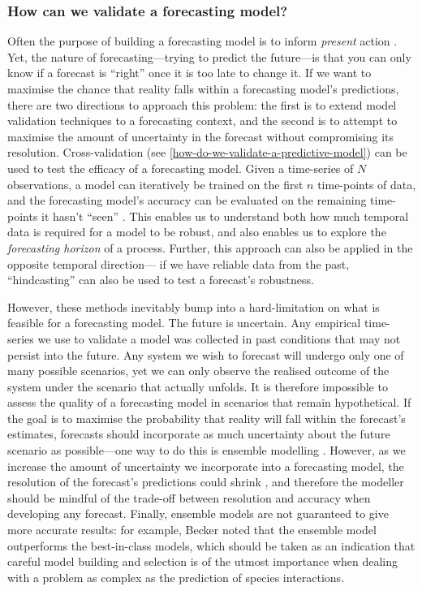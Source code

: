 \subsubsection{How can we validate a forecasting
model?}\label{how-can-we-validate-a-forecasting-model}

Often the purpose of building a forecasting model is to inform
\emph{present} action \cite{Dietze2018IteNea}. Yet, the nature of
forecasting---trying to predict the future---is that you can only know
if a forecast is ``right'' once it is too late to change it. If we want
to maximise the chance that reality falls within a forecasting model's
predictions, there are two directions to approach this problem: the
first is to extend model validation techniques to a forecasting context,
and the second is to attempt to maximise the amount of uncertainty in
the forecast without compromising its resolution. Cross-validation (see
\autoref{how-do-we-validate-a-predictive-model}) can be used to test the
efficacy of a forecasting model. Given a time-series of \(N\)
observations, a model can iteratively be trained on the first \(n\)
time-points of data, and the forecasting model's accuracy can be
evaluated on the remaining time-points it hasn't ``seen''
\cite{Bishop2006PatRec}. This enables us to understand both how much
temporal data is required for a model to be robust, and also enables us
to explore the \emph{forecasting horizon} of a process. Further, this
approach can also be applied in the opposite temporal direction--- if we
have reliable data from the past, ``hindcasting'' can also be used to
test a forecast's robustness.

However, these methods inevitably bump into a hard-limitation on what is
feasible for a forecasting model. The future is uncertain. Any empirical
time-series we use to validate a model was collected in past conditions
that may not persist into the future. Any system we wish to forecast
will undergo only one of many possible scenarios, yet we can only
observe the realised outcome of the system under the scenario that
actually unfolds. It is therefore impossible to assess the quality of a
forecasting model in scenarios that remain hypothetical. If the goal is
to maximise the probability that reality will fall within the forecast's
estimates, forecasts should incorporate as much uncertainty about the
future scenario as possible---one way to do this is ensemble modelling
\cite{Parker2013EnsMod}. However, as we increase the amount of
uncertainty we incorporate into a forecasting model, the resolution of
the forecast's predictions could shrink \cite{Lei2017EvaTra}, and
therefore the modeller should be mindful of the trade-off between
resolution and accuracy when developing any forecast. Finally, ensemble
models are not guaranteed to give more accurate results: for example,
Becker \cite{Becker2020PreWil} noted that the ensemble model outperforms the
best-in-class models, which should be taken as an indication that
careful model building and selection is of the utmost importance when
dealing with a problem as complex as the prediction of species
interactions.

